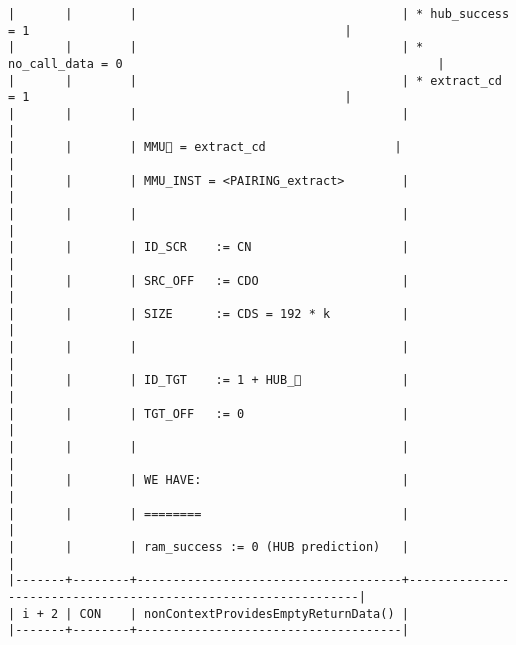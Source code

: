 \documentclass[varwidth=\maxdimen,margin=0.5cm,multi={verbatim}]{standalone}
\begin{document}
\begin{verbatim}
|       |        |                                     | * hub_success  = 1                                            |
|       |        |                                     | * no_call_data = 0                                            |
|       |        |                                     | * extract_cd   = 1                                            |
|       |        |                                     |                                                               |
|       |        | MMU🚩 = extract_cd                  |                                                               |
|       |        | MMU_INST = <PAIRING_extract>        |                                                               |
|       |        |                                     |                                                               |
|       |        | ID_SCR    := CN                     |                                                               |
|       |        | SRC_OFF   := CDO                    |                                                               |
|       |        | SIZE      := CDS = 192 * k          |                                                               |
|       |        |                                     |                                                               |
|       |        | ID_TGT    := 1 + HUB_              |                                                               |
|       |        | TGT_OFF   := 0                      |                                                               |
|       |        |                                     |                                                               |
|       |        | WE HAVE:                            |                                                               |
|       |        | ========                            |                                                               |
|       |        | ram_success := 0 (HUB prediction)   |                                                               |
|-------+--------+-------------------------------------+---------------------------------------------------------------|
| i + 2 | CON    | nonContextProvidesEmptyReturnData() |
|-------+--------+-------------------------------------|
\end{verbatim}
\end{document}
